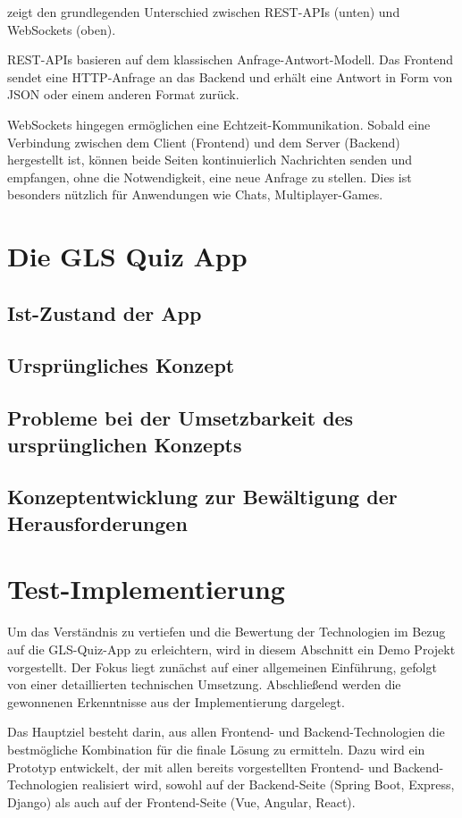 \documentclass[biblatex]{lni}
\begin{document}
 zeigt den grundlegenden Unterschied zwischen REST-APIs (unten) und WebSockets (oben).

REST-APIs basieren auf dem klassischen Anfrage-Antwort-Modell.
Das Frontend sendet eine HTTP-Anfrage an das Backend und erhält eine Antwort in Form von JSON oder einem anderen Format zurück.

WebSockets hingegen ermöglichen eine Echtzeit-Kommunikation.
Sobald eine Verbindung zwischen dem Client (Frontend) und dem Server (Backend) hergestellt ist,
können beide Seiten kontinuierlich Nachrichten senden und empfangen, ohne die Notwendigkeit, eine neue Anfrage zu stellen.
Dies ist besonders nützlich für Anwendungen wie Chats, Multiplayer-Games.

\section{Die GLS Quiz App}
\subsection{Ist-Zustand der App}
\subsection{Ursprüngliches Konzept}
\subsection{Probleme bei der Umsetzbarkeit des ursprünglichen Konzepts}
\subsection{Konzeptentwicklung zur Bewältigung der Herausforderungen}

\section{Test-Implementierung}

Um das Verständnis zu vertiefen und die Bewertung der Technologien im Bezug auf die GLS-Quiz-App zu erleichtern,
wird in diesem Abschnitt ein Demo Projekt vorgestellt.
Der Fokus liegt zunächst auf einer allgemeinen Einführung,
gefolgt von einer detaillierten technischen Umsetzung.
Abschließend werden die gewonnenen Erkenntnisse aus der Implementierung dargelegt.

Das Hauptziel besteht darin,
aus allen Frontend- und Backend-Technologien die bestmögliche Kombination für die finale Lösung zu ermitteln.
Dazu wird ein Prototyp entwickelt, der mit allen bereits vorgestellten Frontend- und Backend-Technologien realisiert wird,
sowohl auf der Backend-Seite (Spring Boot, Express, Django) als auch auf der Frontend-Seite (Vue, Angular, React).
\end{document}
